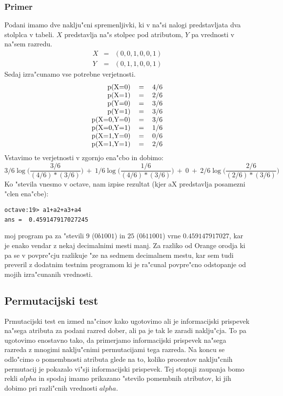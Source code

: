 \documentclass[a4paper,11pt]{article}
\begin{document}
\subsubsection*{Primer}
Podani imamo dve naklju"cni spremenljivki, ki v na"si nalogi predstavljata dva stolplca v tabeli. $X$ predstavlja na"s stolpec pod atributom, $Y$ pa vrednosti v na"sem razredu.
\[
 \begin{matrix}
  X & = & (0,0,1,0,0,1) \\
  Y & = & (0,1,1,0,0,1)
 \end{matrix}
\]
Sedaj izra"cunamo vse potrebne verjetnosti.
\[
\begin{tabular}{rcl}
  p(X=0) & = & 4/6 \\
  p(X=1) & = & 2/6 \\
  p(Y=0) & = & 3/6 \\
  p(Y=1) & = & 3/6 \\
  p(X=0,Y=0) & = & 3/6 \\
  p(X=0,Y=1) & = & 1/6 \\
  p(X=1,Y=0) & = & 0/6 \\
  p(X=1,Y=1) & = & 2/6 \\
\end{tabular} 
\]
Vstavimo te verjetnosti v zgornjo ena"cbo in dobimo:
\[ 3/6 \log \Bigg(\frac{3/6}{(4/6)*(3/6)}\Bigg)\ +\ 1/6 \log \Bigg(\frac{1/6}{(4/6)*(3/6)}\Bigg)\ +\ 0 \ +\ 2/6 \log \Bigg(\frac{2/6}{(2/6)*(3/6)}\Bigg)\]
Ko "stevila vnesmo v octave, nam izpise rezultat (kjer aX predstavlja posamezni "clen ena"cbe):
\begin{verbatim}
octave:19> a1+a2+a3+a4
ans =  0.459147917027245
\end{verbatim}
moj program pa za "stevili $9$ ($0b1001$) in $25$ ($0b11001$) vrne $0.459147917027$, kar je enako vendar z nekaj decimalnimi mesti manj. Za razliko od Orange orodja ki pa se v povpre"cju razlikuje "ze na sedmem decimalnem mestu, kar sem tudi preveril z dodatnim testnim programom ki je ra"cunal povpre"cno odstopanje od mojih izra"cunanih vrednosti.

\subsection{Permutacijski test}

Prmutacijski test en izmed na"cinov kako ugotovimo ali je informacijski prispevek na"sega atributa za podani razred dober, ali pa je tak le zaradi naklju"cja. To pa ugotovimo enostavno tako, da primerjamo informacijski prispevek na"sega razreda z mnogimi naklju"cnimi permutacijami tega razreda. Na koncu se odlo"cimo o pomembnosti atributa glede na to, koliko procentov naklju"cnih permutacij je pokazalo vi"sji informacijski prispevek. Tej stopnji zaupanja bomo rekli $alpha$ in spodaj imamo prikazano "stevilo pomembnih atributov, ki jih dobimo pri razli"cnih vrednosti $alpha$.\\
\end{document}
